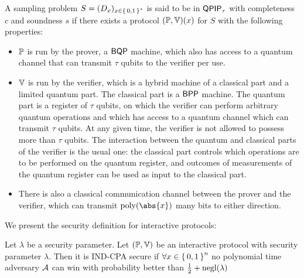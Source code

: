 \begin{definition}
	A sampling problem $S=(D_x)_{x\in\set{0, 1}^*}$ is said to be  in $\operatorname{\mathsf{QPIP}}_\tau$ with completeness $c$ and soundness $s$  if there exists a protocol $(\mathbb{P}, \mathbb{V})(x)$ for $S$ with the following properties:
	\begin{itemize}
		\item $\mathbb{P}$ is run by the prover, a $\operatorname{\mathsf{BQP}}$ machine, which also has access to a quantum channel that can transmit $\tau$ qubits to the verifier per use.
		\item $\mathbb{V}$ is run by the verifier, which is a hybrid machine of a classical part and a limited quantum part. The classical part is a $\operatorname{\mathsf{BPP}}$ machine. The quantum part is a register of $\tau$ qubits, on which the verifier can perform arbitrary quantum operations and which has access to a quantum channel which can transmit $\tau$ qubits. At any given time, the verifier is not allowed to possess more than $\tau$ qubits. The interaction between the quantum and classical parts of the verifier is the usual one: the classical part controls which operations are to be performed on the quantum register, and outcomes of measurements of the quantum register can be used as input to the classical part.
		\item There is also a classical communication channel between the prover and the verifier, which can transmit $\poly(\abs{x})$ many bits to either direction. 
	\end{itemize}
\end{definition}





We present the security definition for interactive protocols:

\begin{definition}

	Let $\lambda$ be a security parameter.
	Let $(\mathbb{P}, \mathbb{V})$ be an interactive protocol with security parameter $\lambda$.
	Then it is IND-CPA secure if $\forall x\in\set{0,1}^n$ no polynomial time adversary $\mathcal{A}$ can win  with probability better than $\frac{1}{2}+\operatorname{negl}(\lambda)$
\end{definition}

